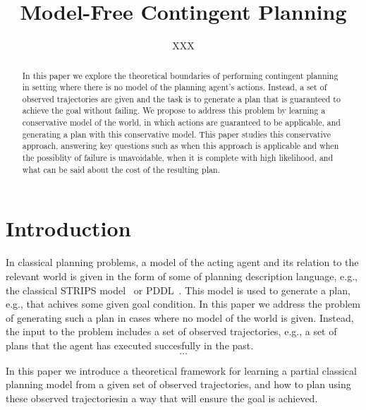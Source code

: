 \documentclass[letterpaper]{article}
\begin{document}
\title{Model-Free Contingent Planning}

\author{XXX}

\maketitle

\begin{abstract}%
In this paper we explore the theoretical boundaries of 
performing contingent planning in setting where 
there is no model of the planning agent's actions. 
Instead, a set of observed trajectories are given 
and the task is to generate a plan that is guaranteed
to achieve the goal without failing. 
We propose to address this problem by learning a conservative model of the world, 
in which actions are guaranteed to be applicable, and generating a plan with this conservative model. 
This paper studies this conservative approach, answering key questions such as 
when this approach is applicable and when the possiblity of failure is unavoidable, 
when it is complete with high likelihood, 
and what can be said about the cost of the resulting plan. 
\end{abstract}


\section{Introduction}
In classical planning problems, a model of the acting agent and its relation to the relevant world is given in the form of some of planning description language, e.g., the classical STRIPS model~\cite{fikes1971strips} or PDDL~\cite{mcdermott1998pddl}. This model is used to generate a plan, e.g., that achives some given goal condition. In this paper we address the problem of generating such a plan in cases where no model of the world is given. Instead, the input to the problem includes a set of observed trajectories, e.g., a set of plans that the agent has executed succesfully in the past. 
\[\ldots\]

In this paper we introduce a theoretical framework for learning a partial classical planning model from a given set of observed trajectories, and how to plan using these observed trajectoriesin a way that will ensure the goal is achieved. 


\end{document}
